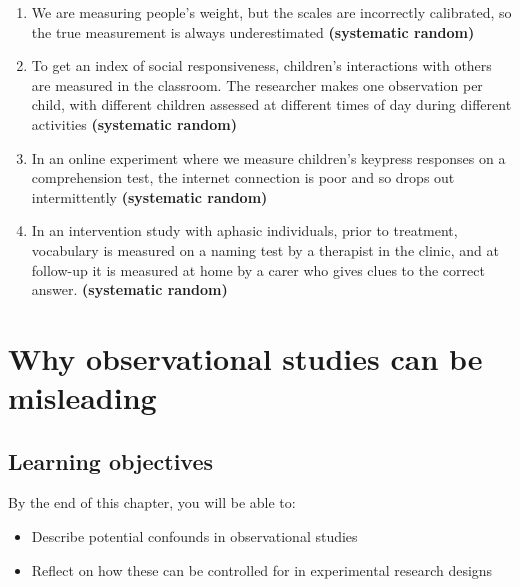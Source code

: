 \documentclass{krantz}
\providecommand{\tightlist}{%
\setlength{\itemsep}{0pt}\setlength{\parskip}{0pt}}
\begin{document}
\begin{enumerate}
\def\labelenumi{\arabic{enumi}.}
\tightlist
\item
  We are measuring people's weight, but the scales are incorrectly calibrated, so the true measurement is always underestimated \textbf{(systematic \textbar{} random)}\\
\item
  To get an index of social responsiveness, children's interactions with others are measured in the classroom. The researcher makes one observation per child, with different children assessed at different times of day during different activities \textbf{(systematic \textbar{} random)}\\
\item
  In an online experiment where we measure children's keypress responses on a comprehension test, the internet connection is poor and so drops out intermittently \textbf{(systematic \textbar{} random)}\\
\item
  In an intervention study with aphasic individuals, prior to treatment, vocabulary is measured on a naming test by a therapist in the clinic, and at follow-up it is measured at home by a carer who gives clues to the correct answer. \textbf{(systematic \textbar{} random)}
\end{enumerate}

\hypertarget{observations}{%
\chapter{Why observational studies can be misleading}\label{observations}}

\hypertarget{learning-objectives-1}{%
\section{Learning objectives}\label{learning-objectives-1}}

By the end of this chapter, you will be able to:

\begin{itemize}
\item
  Describe potential confounds in observational studies
\item
  Reflect on how these can be controlled for in experimental research designs
\end{itemize}
\end{document}
